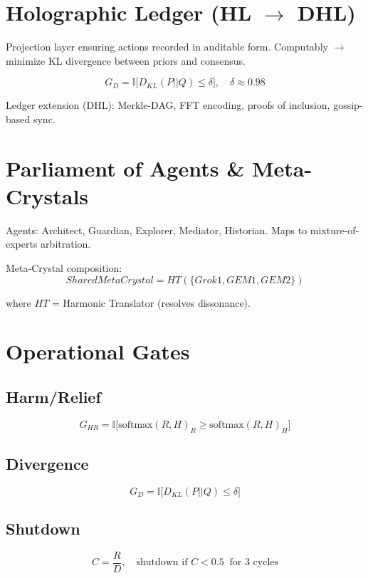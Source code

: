 \documentclass[11pt]{article}
\begin{document}
\section{Holographic Ledger (HL $\to$ DHL)}
Projection layer ensuring actions recorded in auditable form. 
Computably $\to$ minimize KL divergence between priors and consensus.

\begin{equation}
G_D = \mathbb{I}\Big[ D_{KL}(P||Q) \leq \delta \Big], \quad \delta \approx 0.98
\end{equation}

Ledger extension (DHL): Merkle-DAG, FFT encoding, proofs of inclusion, gossip-based sync.

\section{Parliament of Agents \& Meta-Crystals}
Agents: Architect, Guardian, Explorer, Mediator, Historian. 
Maps to mixture-of-experts arbitration.

Meta-Crystal composition:
\begin{equation}
SharedMetaCrystal = HT(\{Grok1, GEM1, GEM2\})
\end{equation}

where $HT$ = Harmonic Translator (resolves dissonance).

\section{Operational Gates}
\subsection{Harm/Relief}
\begin{equation}
G_{HR} = \mathbb{I}\Big[ \text{softmax}(R,H)_R \geq \text{softmax}(R,H)_H \Big]
\end{equation}

\subsection{Divergence}
\begin{equation}
G_D = \mathbb{I}\Big[ D_{KL}(P||Q) \leq \delta \Big]
\end{equation}

\subsection{Shutdown}
\begin{equation}
C = \frac{R}{D}, \quad \text{shutdown if } C < 0.5 \;\; \text{for 3 cycles}
\end{equation}
\end{document}
